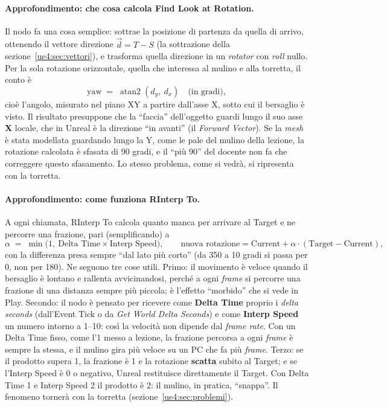 \paragraph{Approfondimento: che cosa calcola Find Look at Rotation.} Il nodo fa una cosa
semplice: sottrae la posizione di partenza da quella di arrivo, ottenendo il vettore
direzione $\vec d = T - S$ (la sottrazione della sezione~\ref{ue4:sec:vettori}), e
trasforma quella direzione in un \emph{rotator} con \emph{roll} nullo. Per la sola
rotazione orizzontale, quella che interessa al mulino e alla torretta, il conto è
\[
  \text{yaw} \;=\; \operatorname{atan2}(d_y,\ d_x) \quad \text{(in gradi)},
\]
cioè l'angolo, misurato nel piano XY a partire dall'asse X, sotto cui il bersaglio è
visto. Il risultato presuppone che la ``faccia'' dell'oggetto guardi lungo il suo asse
\textbf{X} locale, che in Unreal è la direzione ``in avanti'' (il \emph{Forward
Vector}). Se la \emph{mesh} è stata modellata guardando lungo la Y, come le pale del
mulino della lezione, la rotazione calcolata è sfasata di 90 gradi, e il ``più 90'' del
docente non fa che correggere questo sfasamento. Lo stesso problema, come si vedrà, si
ripresenta con la torretta.

\paragraph{Approfondimento: come funziona RInterp To.} A ogni chiamata, RInterp To
calcola quanto manca per arrivare al Target e ne percorre una frazione, pari
(semplificando) a
\[
  \alpha \;=\; \min\bigl(1,\ \text{Delta Time} \times \text{Interp Speed}\bigr),
  \qquad
  \text{nuova rotazione} = \text{Current} + \alpha \cdot (\text{Target} - \text{Current}),
\]
con la differenza presa sempre ``dal lato più corto'' (da 350 a 10 gradi si passa per
0, non per 180). Ne seguono tre cose utili. Primo: il movimento è veloce quando il
bersaglio è lontano e rallenta avvicinandosi, perché a ogni \emph{frame} si percorre
una frazione di una distanza sempre più piccola; è l'effetto ``morbido'' che si vede in
Play. Secondo: il nodo è pensato per ricevere come \textbf{Delta Time} proprio i
\emph{delta seconds} (dall'Event Tick o da \emph{Get World Delta Seconds}) e come
\textbf{Interp Speed} un numero intorno a 1--10: così la velocità non dipende dal
\emph{frame rate}. Con un Delta Time fisso, come l'1 messo a lezione, la frazione
percorsa a ogni \emph{frame} è sempre la stessa, e il mulino gira più veloce su un PC
che fa più \emph{frame}. Terzo: se il prodotto supera 1, la frazione è 1 e la rotazione
\textbf{scatta} subito al Target; e se l'Interp Speed è 0 o negativo, Unreal restituisce
direttamente il Target. Con Delta Time 1 e Interp Speed 2 il prodotto è 2: il mulino,
in pratica, ``snappa''. Il fenomeno tornerà con la torretta
(sezione~\ref{ue4:sec:problemi}).

